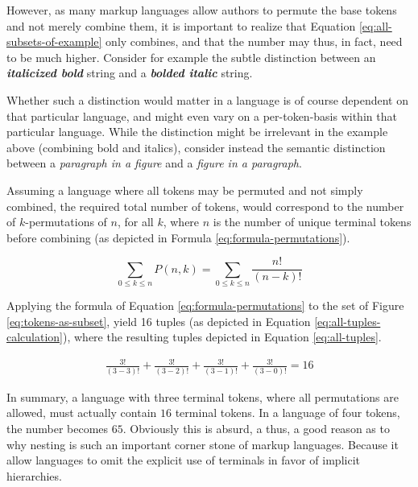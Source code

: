 \documentclass{scrreprt}
\begin{document}
However, as many markup languages allow authors to permute the base tokens and not merely combine them, it is important to realize that Equation \ref{eq:all-subsets-of-example} only combines, and that the number may thus, in fact, need to be much higher. Consider for example the subtle distinction between an \textit{\textbf{italicized bold}} string and a \textit{\textbf{bolded italic}} string.

Whether such a distinction would matter in a language is of course dependent on that particular language, and might even vary on a per-token-basis within that particular language. While the distinction might be irrelevant in the example above (combining bold and italics), consider instead the semantic distinction between a \emph{paragraph in a figure} and a \emph{figure in a paragraph}.

Assuming a language where all tokens may be permuted and not simply combined, the required total number of tokens, would correspond to the number of $k$-permutations of $n$, for all $k$, where $n$ is the number of unique terminal tokens before combining (as depicted in Formula \ref{eq:formula-permutations}).


\begin{equation}
\sum_{0\leq{k}\leq{n}} P(n,k) = 
\sum_{0\leq{k}\leq{n}} \frac{n!}{(n-k)!}
\label{eq:formula-permutations}
\end{equation}

Applying the formula of Equation \ref{eq:formula-permutations} to the set of Figure \ref{eq:tokens-as-subset}, yield 16 tuples (as depicted in Equation \ref{eq:all-tuples-calculation}), where the resulting tuples depicted in Equation \ref{eq:all-tuples}.



\begin{equation}
\begin{split}
\frac{3!}{(3-3)!} + \frac{3!}{(3-2)!} + \frac{3!}{(3-1)!} + \frac{3!}{(3-0)!} = 
16
\label{eq:all-tuples-calculation}
\end{split}
\end{equation}



In summary, a language with three terminal tokens, where all permutations are allowed, must actually contain $16$ terminal tokens. In a language of four tokens, the number becomes $65$. Obviously this is absurd, a thus, a good reason as to why nesting is such an important corner stone of markup languages. Because it allow languages to omit the explicit use of terminals in favor of implicit hierarchies.
\end{document}
